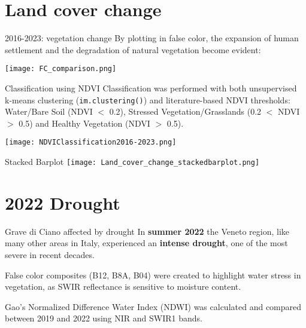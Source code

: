 \documentclass{beamer}
\begin{document}
\section{Land cover change}


\begin{frame}{2016-2023: vegetation change}
        \centering
        By plotting in false color, the expansion of human settlement and the degradation of natural vegetation become evident:\bigskip
        
        \texttt{[image: FC\_comparison.png]}
        \caption{\footnotesize False color view of Montello, June 2016 (left), June 2023 (right)}
\end{frame}


\begin{frame}{Classification using NDVI}
     \centering
     Classification was performed with both unsupervised k-means clustering (\texttt{im.clustering()}) and literature-based NDVI thresholds: Water/Bare Soil (NDVI $<$ 0.2), Stressed Vegetation/Grasslands (0.2 $<$ NDVI $>$ 0.5) and Healthy Vegetation (NDVI $>$ 0.5).
     
        
    \texttt{[image: NDVIClassification2016-2023.png]}
   
\end{frame}

\begin{frame}{Stacked Barplot}
     \centering
    \texttt{[image: Land\_cover\_change\_stackedbarplot.png]}
\end{frame}


\section{2022 Drought}

\begin{frame}{Grave di Ciano affected by drought}
     \centering
     In \textbf{summer 2022} the Veneto region, like many other areas in Italy, experienced an \textbf{intense drought}, one of the most severe in recent decades.  \bigskip

     False color composites (B12, B8A, B04) were created to highlight water stress in vegetation, as SWIR reflectance is sensitive to moisture content. \bigskip
     
     Gao’s Normalized Difference Water Index (NDWI) was calculated and compared between 2019 and 2022 using NIR and SWIR1 bands.
\end{frame}
\end{document}
